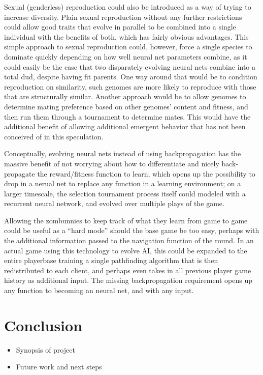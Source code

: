\documentclass[letterpaper]{article}
\begin{document}
Sexual (genderless) reproduction could also be introduced as a way of trying to
increase diversity. Plain sexual reproduction without any further restrictions
could allow good traits that evolve in parallel to be combined into a single
individual with the benefits of both, which has fairly obvious advantages.
This simple approach to sexual reproduction could, however, force a single
species to dominate quickly depending on how well neural net parameters combine,
as it could easily be the case that two disparately evolving neural nets combine
into a total dud, despite having fit parents. One way around that would be to
condition reproduction on similarity, such genomes are more likely to reproduce
with those that are structurally similar. Another approach would be to allow
genomes to determine mating preference based on other genomes' content and
fitness, and then run them through a tournament to determine mates. This would
have the additional benefit of allowing additional emergent behavior that has
not been conceived of in this speculation.

Conceptually, evolving neural nets instead of using backpropagation
has the massive benefit of not worrying about how to differentiate and nicely
back-propagate the reward/fitness function to learn, which opens up the
possibility to drop in a nerual net to replace any function in a learning
environment; on a larger timescale, the selection tournament process itself
could modeled with a recurrent neural network, and evolved over multiple plays
of the game.

Allowing the zombunnies to keep track of what they learn from game to game could
be useful as a ``hard mode'' should the base game be too easy, perhaps with the
additional information passed to the navigation function of the round. In an actual game
using this technology to evolve AI, this could be expanded to the entire
playerbase training a single pathfinding algorithm that is then redistributed to
each client, and perhaps even takes in all previous player game history as
additional input. The missing backpropagation requirement opens up
any function to becoming an neural net, and with any input.

\section{Conclusion}
\begin{itemize}
    \item Synopsis of project
    \item Future work and next steps
\end{itemize}
\end{document}
